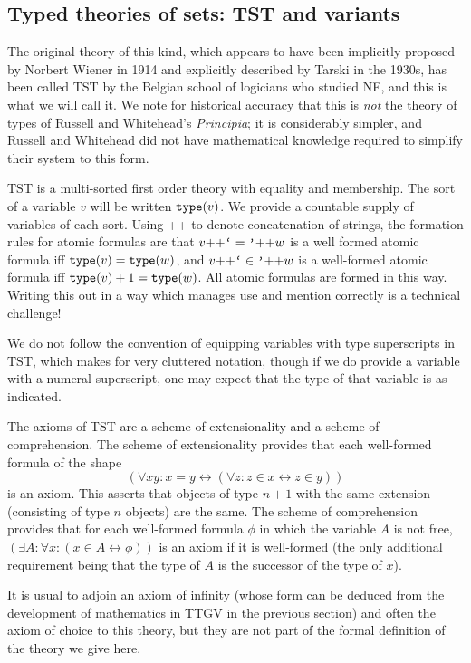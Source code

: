 \documentclass[12pt]{article}
\begin{document}
\subsection{Typed theories of sets:  TST and variants}

The original theory of this kind, which appears to have been implicitly proposed by Norbert Wiener in 1914 and explicitly described by Tarski in the 1930s, has been called TST by the Belgian school of logicians who studied NF, and this is what we will call it.  We note for historical accuracy that this is {\em not\/} the theory of types of Russell and Whitehead's {\em Principia\/};  it is considerably simpler, and Russell and Whitehead did not have mathematical knowledge required to simplify their system to this form.

TST is a multi-sorted first order theory with equality and membership.  The sort of a variable $v$ will be written ${\tt type}(v)$.  We provide a countable supply of variables of each sort.  Using ++ to denote concatenation of strings, the formation rules for atomic formulas are that $v{\tt ++}\verb|`|=\verb|'|{\tt ++}w$ is a well formed atomic formula iff ${\tt type}(v)={\tt type}(w)$, and 
$v{\tt ++}\verb|`|\in\verb|'|{\tt ++}w$ is a well-formed atomic formula iff ${\tt type}(v)+1 ={\tt type}(w)$.  All atomic formulas are formed in this way.  Writing this out in a way which manages use and mention correctly is a technical challenge!

We do not follow the convention of equipping variables with type superscripts in TST, which makes for very cluttered notation, though if we do provide a variable with a numeral superscript, one may expect that the type of that variable is as indicated.

The axioms of TST are a scheme of extensionality and a scheme of comprehension.  The scheme of extensionality provides that each well-formed formula of the shape $$(\forall xy:x=y \leftrightarrow (\forall z:z\in x \leftrightarrow z \in y))$$ is an axiom.  This asserts that objects of type $n+1$ with the same extension (consisting of type $n$ objects) are the same.  The scheme of comprehension provides that for each well-formed formula $\phi$ in which the variable $A$ is not free, 
$(\exists A:\forall x:(x \in A \leftrightarrow \phi))$ is an axiom if it is well-formed (the only additional requirement being that the type of $A$ is the successor of the type of $x$).

It is usual to adjoin an axiom of infinity (whose form can be deduced from the development of mathematics in TTGV in the previous section) and often the axiom of choice to this theory, but they are not part of the formal definition of the theory we give here.
\end{document}

